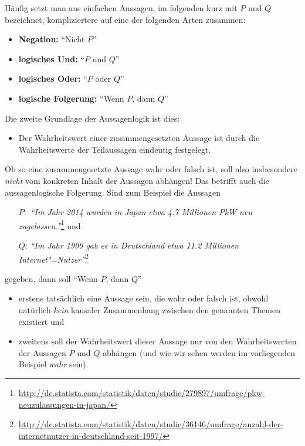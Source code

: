 Häufig setzt man aus einfachen Aussagen, im folgenden kurz mit $P$
und $Q$ bezeichnet, kompliziertere auf eine der folgenden Arten
zusammen:

\begin{itemize}
\item \textbf{Negation:} "`Nicht  $P$"' 
\item \textbf{logisches Und:} "`$P$ und $Q$"' 
\item \textbf{logisches Oder:} "`$P$ oder $Q$"' 
\item \textbf{logische Folgerung:} "`Wenn $P$, dann $Q$"' 
\end{itemize}

\noindent
\begin{samepage}
Die zweite Grundlage der Aussagenlogik ist dies:
\begin{itemize}
\item Der Wahrheitswert einer zusammengesetzten Aussage ist durch die
  Wahrheitswerte der Teilaussagen eindeutig festgelegt.
\end{itemize}
\end{samepage}
%
Ob so eine zusammengesetzte Aussage wahr oder falsch ist, soll also
insbesondere \emph{nicht} vom konkreten Inhalt der Aussagen abhängen!
%
Das betrifft auch die aussagenlogische Folgerung.
%
Sind zum Beispiel die Aussagen
\begin{itemize}
\item[$P:$] \emph{"`Im Jahr 2014 wurden in Japan etwa 4.7
    Millionen PkW neu
    zugelassen."'}\footnote{\url{http://de.statista.com/statistik/daten/studie/279897/umfrage/pkw-neuzulassungen-in-japan/}}
  und
\item[$Q$:] \emph{"`Im Jahr 1999 gab es in Deutschland etwa 11.2
    Millionen
    Internet"=Nutzer"'}\footnote{\url{http://de.statista.com/statistik/daten/studie/36146/umfrage/anzahl-der-internetnutzer-in-deutschland-seit-1997/}}
\end{itemize}
%
gegeben, dann soll "`Wenn $P$, dann $Q$"' 
\begin{itemize}
\item erstens tatsächlich eine Aussage sein, die wahr oder falsch ist,
  obwohl natürlich \emph{kein} kausaler Zusammenhang zwischen den
  genannten Themen existiert %
  und
\item zweitens soll der Wahrheitswert dieser Aussage nur von den
  Wahrheitswerten der Aussagen $P$ und $Q$ abhängen (und wie wir sehen
  werden im vorliegenden Beispiel \emph{wahr} sein).
\end{itemize}


